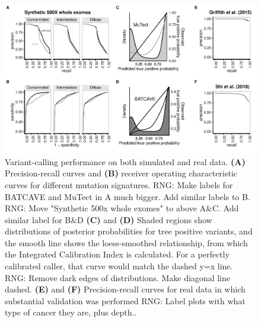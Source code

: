 \documentclass[a4,center,fleqn]{NAR}
\newcommand{\rngcomment}[1]{{\color{red}RNG: #1}}
\newcommand{\batcave}{BATCAVE }
\begin{document}
  \begin{figure}
    \begin{center}
    \includegraphics{figures/fig_wes.pdf}
    \end{center}
    \caption{Variant-calling performance on both simulated and real data.
    \textbf{(A)} Precision-recall curves and \textbf{(B)} receiver operating characteristic curves for different mutation signatures.
    \rngcomment{Make labels for \batcave and MuTect in A much bigger. Add similar labels to B.}
    \rngcomment{Move "Synthetic 500x whole exomes" to above A\&C. Add similar label for B\&D}
    \textbf{(C)} and \textbf{(D)} Shaded regions show distributions of posterior probabilities for tree positive variants, and the smooth line shows the loess-smoothed relationship, from which the Integrated Calibration Index is calculated. For a perfectly calibrated caller, that curve would match the dashed y=x line. 
    \rngcomment{Remove dark edges of distributions. Make diagonal line dashed.}
    \textbf{(E)} and \textbf{(F)} Precision-recall curves for real data in which substantial validation was performed
    \rngcomment{Label plots with what type of cancer they are, plus depth.}.}
  \label{NAR-wes_fig}
  \end{figure}
  
\end{document}
